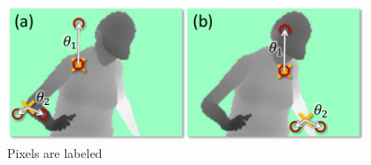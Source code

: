 \begin{figure}
	[h] \centering 
	\includegraphics[height=4cm]{figures/content/ni-label.png} \caption{Pixels are labeled} \label{fg:ni:label} 
\end{figure}

